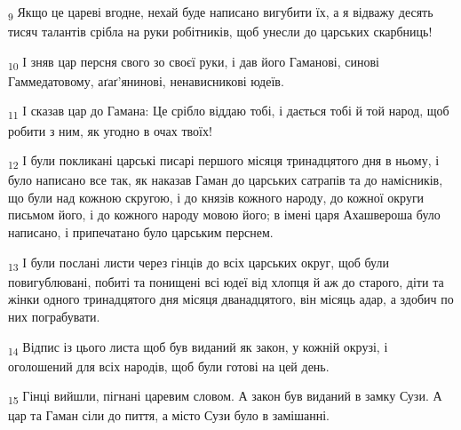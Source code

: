 \begin{tcolorbox}
\textsubscript{9} Якщо це цареві вгодне, нехай буде написано вигубити їх, а я відважу десять тисяч талантів срібла на руки робітників, щоб унесли до царських скарбниць!
\end{tcolorbox}
\begin{tcolorbox}
\textsubscript{10} І зняв цар персня свого зо своєї руки, і дав його Гаманові, синові Гаммедатовому, аґаґ'янинові, ненависникові юдеїв.
\end{tcolorbox}
\begin{tcolorbox}
\textsubscript{11} І сказав цар до Гамана: Це срібло віддаю тобі, і дається тобі й той народ, щоб робити з ним, як угодно в очах твоїх!
\end{tcolorbox}
\begin{tcolorbox}
\textsubscript{12} І були покликані царські писарі першого місяця тринадцятого дня в ньому, і було написано все так, як наказав Гаман до царських сатрапів та до намісників, що були над кожною скругою, і до князів кожного народу, до кожної округи письмом його, і до кожного народу мовою його; в імені царя Ахашвероша було написано, і припечатано було царським перснем.
\end{tcolorbox}
\begin{tcolorbox}
\textsubscript{13} І були послані листи через гінців до всіх царських округ, щоб були повигублювані, побиті та понищені всі юдеї від хлопця й аж до старого, діти та жінки одного тринадцятого дня місяця дванадцятого, він місяць адар, а здобич по них пограбувати.
\end{tcolorbox}
\begin{tcolorbox}
\textsubscript{14} Відпис із цього листа щоб був виданий як закон, у кожній окрузі, і оголошений для всіх народів, щоб були готові на цей день.
\end{tcolorbox}
\begin{tcolorbox}
\textsubscript{15} Гінці вийшли, пігнані царевим словом. А закон був виданий в замку Сузи. А цар та Гаман сіли до пиття, а місто Сузи було в замішанні.
\end{tcolorbox}
